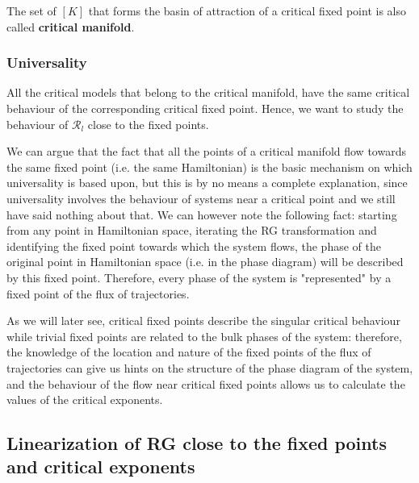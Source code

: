\documentclass[../../Main/Main.tex]{subfiles}
\begin{document}
The set of \( [K] \) that forms the basin of attraction of a critical fixed point is also called \textbf{critical manifold}.

\subsubsection{Universality}

All the critical models that belong to the critical manifold, have the same critical behaviour of the corresponding critical fixed point. Hence, we want to study the behaviour of \( \mathcal{R}_l \) close to the fixed points.

 We can argue that the fact that all the points of a critical manifold flow towards the same fixed point (i.e. the same Hamiltonian) is the basic mechanism on which universality is based upon, but this is by no means a complete explanation, since universality involves the behaviour of systems near a critical point and we still have said nothing about that. We can however note the following fact: starting from any point in Hamiltonian space, iterating the RG transformation and identifying the fixed point towards which the system flows, the phase of the original point in Hamiltonian space (i.e. in the phase diagram) will be described by this fixed point. Therefore, every phase of the system is "represented" by a fixed point of the flux of trajectories.


As we will later see, critical fixed points describe the singular critical behaviour while trivial fixed points are related to the bulk phases of the system: therefore, the knowledge of the location and nature of the fixed points of the flux of trajectories can give us hints on the structure of the phase diagram of the system, and the behaviour of the flow near critical fixed points allows us to calculate the values of the critical exponents.




\subsection{Linearization of RG close to the fixed points and critical exponents}
\end{document}
